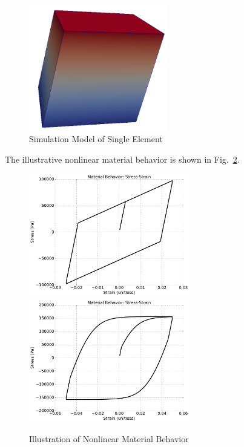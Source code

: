 \begin{figure}[H]
  \centering
  \includegraphics[width = 6cm]{./Figure-files/Day1/Single_element_Models_illustrate_the_elastic-plastic_behavior/overview.png}
  \caption{Simulation Model of Single Element}
  \label{fig_single_element_elastic-plastic}
\end{figure}

The illustrative nonlinear material behavior is shown in Fig.~\ref{fig_day1_illustration_nonlinear_single_element}.

\begin{figure}[H]
  \centering
  \includegraphics[width = 7cm]{./Figure-files/Day1/Single_element_Models_illustrate_the_elastic-plastic_behavior/vonMises.pdf}
  \includegraphics[width = 7cm]{./Figure-files/Day1/Single_element_Models_illustrate_the_elastic-plastic_behavior/DruckerPrager.pdf}
  \caption{ Illustration of Nonlinear Material Behavior }
  \label{fig_day1_illustration_nonlinear_single_element}
\end{figure}



